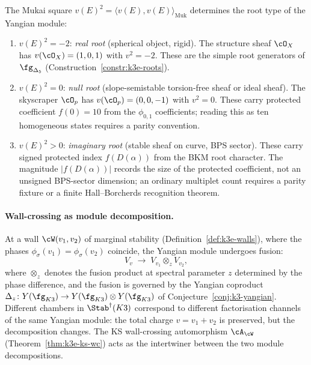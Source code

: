 \begin{remark}
\label{rem:bridgeland-root-type}
The Mukai square $v(E)^2 = \langle v(E), v(E) \rangle_{\mathrm{Muk}}$ determines the root type of the Yangian module:
\begin{enumerate}[label=(\roman*)]
\item $v(E)^2 = -2$: \emph{real root} (spherical object, rigid). The structure sheaf $\cO_X$ has $v(\cO_X) = (1, 0, 1)$ with $v^2 = -2$. These are the simple root generators of $\fg_{\Delta_5}$ (Construction~\ref{constr:k3e-roots}).
\item $v(E)^2 = 0$: \emph{null root} (slope-semistable torsion-free sheaf or ideal sheaf). The skyscraper $\cO_p$ has $v(\cO_p) = (0, 0, -1)$ with $v^2 = 0$. These carry protected coefficient $f(0) = 10$ from the $\phi_{0,1}$ coefficients; reading this as ten homogeneous states requires a parity convention.
\item $v(E)^2 > 0$: \emph{imaginary root} (stable sheaf on curve, BPS sector). These carry signed protected index $f(D(\alpha))$ from the BKM root character. The magnitude $|f(D(\alpha))|$ records the size of the protected coefficient, not an unsigned BPS-sector dimension; an ordinary multiplet count requires a parity fixture or a finite Hall--Borcherds recognition theorem.
\end{enumerate}
\end{remark}

\paragraph{Wall-crossing as module decomposition.}
At a wall $\cW(v_1, v_2)$ of marginal stability (Definition~\ref{def:k3e-walls}), where the phases $\phi_\sigma(v_1) = \phi_\sigma(v_2)$ coincide, the Yangian module undergoes fusion:
\begin{equation}\label{eq:yangian-wall-crossing-fusion}
 V_v \;\longrightarrow\; V_{v_1} \otimes_z V_{v_2},
\end{equation}
where $\otimes_z$ denotes the fusion product at spectral parameter $z$ determined by the phase difference, and the fusion is governed by the Yangian coproduct $\Delta_z \colon Y(\fg_{K3}) \to Y(\fg_{K3}) \otimes Y(\fg_{K3})$ of Conjecture~\ref{conj:k3-yangian}. Different chambers in $\Stab^\dagger(K3)$ correspond to different factorisation channels of the same Yangian module: the total charge $v = v_1 + v_2$ is preserved, but the decomposition changes. The KS wall-crossing automorphism $\cA_{\cW}$ (Theorem~\ref{thm:k3e-ks-wc}) acts as the intertwiner between the two module decompositions.

